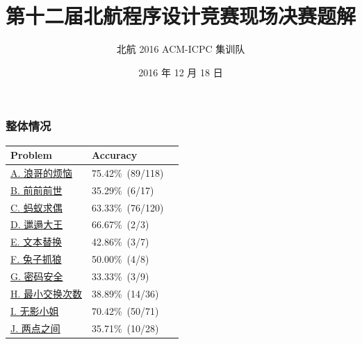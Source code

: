 \documentclass[notheorems]{beamer}
\newcommand{\zhProbA}{浪哥的烦恼}	\newcommand{\AuthProbA}{\textbf{\underline{\href{http://codeforces.com/profile/shell0011}{shell0011}}}}
\newcommand{\zhProbB}{前前前世}		\newcommand{\AuthProbB}{\textbf{\underline{\href{http://codeforces.com/profile/EZ_fwtt08}{ez\_fwtt08}}}}
\newcommand{\zhProbC}{蚂蚁求偶}		\newcommand{\AuthProbC}{\textbf{\underline{\href{http://codeforces.com/profile/Phasianus}{Dshawn}}}}
\newcommand{\zhProbD}{邋遢大王}		\newcommand{\AuthProbD}{\textbf{\underline{\href{http://codeforces.com/profile/Phasianus}{Dshawn}}} 和 \textbf{\underline{\href{http://codeforces.com/profile/Tangjz}{Tangjz}}}}
\newcommand{\zhProbE}{文本替换}		\newcommand{\AuthProbE}{\textbf{\underline{\href{http://codeforces.com/profile/chffy}{chffy}}}}
\newcommand{\zhProbF}{兔子抓狼}		\newcommand{\AuthProbF}{\textbf{\underline{\href{http://codeforces.com/profile/yaoling}{yaoling}}}}
\newcommand{\zhProbG}{密码安全}		\newcommand{\AuthProbG}{\textbf{\underline{\href{http://codeforces.com/profile/Tangjz}{Tangjz}}}}
\newcommand{\zhProbH}{最小交换次数}	\newcommand{\AuthProbH}{\textbf{\underline{\href{http://codeforces.com/profile/chffy}{chffy}}}}
\newcommand{\zhProbI}{无影小姐}		\newcommand{\AuthProbI}{\textbf{\underline{\href{http://codeforces.com/profile/constroy}{constroy}}}}
\newcommand{\zhProbJ}{两点之间}		\newcommand{\AuthProbJ}{\textbf{\underline{\href{http://codeforces.com/profile/Phasianus}{Dshawn}}}}
\newcommand{\AccInProbA}{89}	\newcommand{\SubInProbA}{118}	\newcommand{\RatInProbA}{75.42\%}
\newcommand{\AccInProbB}{6}	\newcommand{\SubInProbB}{17}	\newcommand{\RatInProbB}{35.29\%}
\newcommand{\AccInProbC}{76}	\newcommand{\SubInProbC}{120}	\newcommand{\RatInProbC}{63.33\%}
\newcommand{\AccInProbD}{2}	\newcommand{\SubInProbD}{3}	\newcommand{\RatInProbD}{66.67\%}
\newcommand{\AccInProbE}{3}	\newcommand{\SubInProbE}{7}	\newcommand{\RatInProbE}{42.86\%}
\newcommand{\AccInProbF}{4}	\newcommand{\SubInProbF}{8}	\newcommand{\RatInProbF}{50.00\%}
\newcommand{\AccInProbG}{3}	\newcommand{\SubInProbG}{9}	\newcommand{\RatInProbG}{33.33\%}
\newcommand{\AccInProbH}{14}	\newcommand{\SubInProbH}{36}	\newcommand{\RatInProbH}{38.89\%}
\newcommand{\AccInProbI}{50}	\newcommand{\SubInProbI}{71}	\newcommand{\RatInProbI}{70.42\%}
\newcommand{\AccInProbJ}{10}	\newcommand{\SubInProbJ}{28}	\newcommand{\RatInProbJ}{35.71\%}
\begin{document}
\title[The 12th BCPC Final Round Solutions]{第十二届北航程序设计竞赛现场决赛题解}
\author[BeihangU 2016 ACM-ICPC Training Team]{北航 2016 ACM-ICPC 集训队}
\date[December 18th, 2016]{2016 年 12 月 18 日}
\frame{\titlepage}

\begin{frame}[label = Overview]
\frametitle{整体情况}
\begin{center} \begin{spacing}{1.1}
\begin{tabular}{lll}
\toprule
Problem					&	Accuracy							\\
\midrule
\hyperlink{ProbA}{A. \zhProbA}	&	\RatInProbA\ (\AccInProbA/\SubInProbA)	\\
\hyperlink{ProbB}{B. \zhProbB}	&	\RatInProbB\ (\AccInProbB/\SubInProbB)	\\
\hyperlink{ProbC}{C. \zhProbC}	&	\RatInProbC\ (\AccInProbC/\SubInProbC)	\\
\hyperlink{ProbD}{D. \zhProbD}	&	\RatInProbD\ (\AccInProbD/\SubInProbD)	\\
\hyperlink{ProbE}{E. \zhProbE}	&	\RatInProbE\ (\AccInProbE/\SubInProbE)	\\
\hyperlink{ProbF}{F. \zhProbF}	&	\RatInProbF\ (\AccInProbF/\SubInProbF)	\\
\hyperlink{ProbG}{G. \zhProbG}	&	\RatInProbG\ (\AccInProbG/\SubInProbG)	\\
\hyperlink{ProbH}{H. \zhProbH}	&	\RatInProbH\ (\AccInProbH/\SubInProbH)	\\
\hyperlink{ProbI}{I. \zhProbI}	&	\RatInProbI\ (\AccInProbI/\SubInProbI)	\\
\hyperlink{ProbJ}{J. \zhProbJ}	&	\RatInProbJ\ (\AccInProbJ/\SubInProbJ)	\\
\bottomrule
\end{tabular}
\end{spacing} \end{center}
\hyperlink{End}{}
\end{frame}
\end{document}
